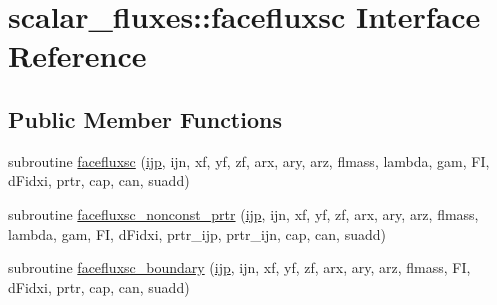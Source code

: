 \hypertarget{interfacescalar__fluxes_1_1facefluxsc}{\section{scalar\-\_\-fluxes\-:\-:facefluxsc Interface Reference}
\label{interfacescalar__fluxes_1_1facefluxsc}
}
\subsection*{Public Member Functions}
\begin{DoxyCompactItemize}
\item 
subroutine \hyperlink{interfacescalar__fluxes_1_1facefluxsc_a68abc0ee379e9a19d00b339599a23c4b}{facefluxsc} (\hyperlink{CourantNo_8h_accea320a458bb8759c7ece360e05ddf4}{ijp}, ijn, xf, yf, zf, arx, ary, arz, flmass, lambda, gam, F\-I, d\-Fidxi, prtr, cap, can, suadd)
\item 
subroutine \hyperlink{interfacescalar__fluxes_1_1facefluxsc_a17ea978f35e3708c8c597b8ffab1df52}{facefluxsc\-\_\-nonconst\-\_\-prtr} (\hyperlink{CourantNo_8h_accea320a458bb8759c7ece360e05ddf4}{ijp}, ijn, xf, yf, zf, arx, ary, arz, flmass, lambda, gam, F\-I, d\-Fidxi, prtr\-\_\-ijp, prtr\-\_\-ijn, cap, can, suadd)
\item 
subroutine \hyperlink{interfacescalar__fluxes_1_1facefluxsc_ae48b1d123dcd71824c9d740bf2e08ccd}{facefluxsc\-\_\-boundary} (\hyperlink{CourantNo_8h_accea320a458bb8759c7ece360e05ddf4}{ijp}, ijn, xf, yf, zf, arx, ary, arz, flmass, F\-I, d\-Fidxi, prtr, cap, can, suadd)
\end{DoxyCompactItemize}


